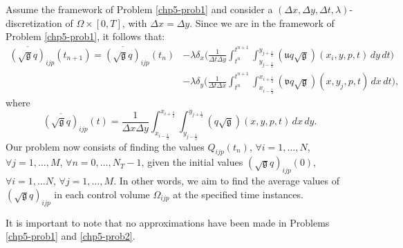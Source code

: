 \begin{prob}
	\label{chp5-prob2}
	Assume the framework of Problem \ref{chp5-prob1}
	and consider a $(\Delta x, \Delta y, \Delta t, \lambda)$-discretization of $\Omega\times [0,T]$, with $\Delta x= \Delta y$.
	Since we are in the framework of Problem \ref{chp5-prob1}, it follows that:
	\begin{align*}
		\overline{(\sqrt{\mathfrak{g}}q)}_{ijp}(t_{n+1})  = \overline{(\sqrt{\mathfrak{g}}q)}_{ijp}(t_{n})
		&- { \lambda}
		\delta _x \bigg( \frac{1}{\Delta t \Delta y}
		\int_{t^n}^{t^{n+1}} \int_{y_{j-\frac{1}{2}}}^{y_{j+\frac{1}{2}}} 
		{(\mathfrak{u}q\sqrt{\mathfrak{g}})}(x_{i}, y, p, t)
		\,dy \,dt \bigg) \\ \nonumber
		&- {\lambda}
		\delta _y \bigg( \frac{1}{\Delta t \Delta x}
		\int_{t^n}^{t^{n+1}} \int_{x_{i-\frac{1}{2}}}^{x_{i+\frac{1}{2}}} 
		{(\mathfrak{v}q\sqrt{\mathfrak{g}})}(x, y_{j}, p, t)
		\,dx \,dt \bigg),
	\end{align*}
	where
	\begin{equation}
		\overline{(\sqrt{\mathfrak{g}}q)}_{ijp}(t) = \frac{1}{\Delta x \Delta y}
		\int_{x_{i-\frac{1}{2}}}^{x_{i+\frac{1}{2}}} 
		\int_{y_{j-\frac{1}{2}}}^{y_{j+\frac{1}{2}}} {(q\sqrt{\mathfrak{g}})}(x,y,p,t) \,dx \,dy.
	\end{equation}
	Our problem now consists of finding the values ${Q}_{ijp}(t_{n})$, 
	$\forall i = 1, \ldots, N$, $\forall j = 1, \ldots, M$, $\forall n = 0, \ldots, N_T-1$,
	given the initial values ${(\sqrt{\mathfrak{g}}q)}_{ijp}(0)$, $\forall i = 1, \ldots N$, $\forall j = 1, \ldots, M$.
	In other words, we aim to find the average values of ${(\sqrt{\mathfrak{g}}q)}_{ijp}$ in each control volume $\Omega_{ijp}$ at the specified time instances.
\end{prob}
It is important to note that no approximations have been made in Problems \eqref{chp5-prob1} and \eqref{chp5-prob2}. 
